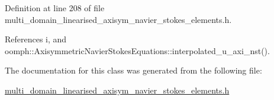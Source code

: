 Definition at line 208 of file multi\+\_\+domain\+\_\+linearised\+\_\+axisym\+\_\+navier\+\_\+stokes\+\_\+elements.\+h.



References i, and oomph\+::\+Axisymmetric\+Navier\+Stokes\+Equations\+::interpolated\+\_\+u\+\_\+axi\+\_\+nst().



The documentation for this class was generated from the following file\+:\begin{DoxyCompactItemize}
\item 
\hyperlink{multi__domain__linearised__axisym__navier__stokes__elements_8h}{multi\+\_\+domain\+\_\+linearised\+\_\+axisym\+\_\+navier\+\_\+stokes\+\_\+elements.\+h}\end{DoxyCompactItemize}
